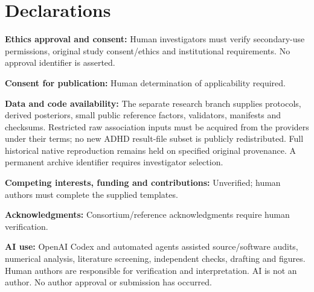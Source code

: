 \documentclass[11pt]{article}
\begin{document}
\section*{Declarations}
\textbf{Ethics approval and consent:} Human investigators must verify secondary-use permissions, original study consent/ethics and institutional requirements. No approval identifier is asserted.\par
\textbf{Consent for publication:} Human determination of applicability required.\par
\textbf{Data and code availability:} The separate research branch supplies protocols, derived posteriors, small public reference factors, validators, manifests and checksums. Restricted raw association inputs must be acquired from the providers under their terms; no new ADHD result-file subset is publicly redistributed. Full historical native reproduction remains held on specified original provenance. A permanent archive identifier requires investigator selection.\par
\textbf{Competing interests, funding and contributions:} Unverified; human authors must complete the supplied templates.\par
\textbf{Acknowledgments:} Consortium/reference acknowledgments require human verification.\par
\textbf{AI use:} OpenAI Codex and automated agents assisted source/software audits, numerical analysis, literature screening, independent checks, drafting and figures. Human authors are responsible for verification and interpretation. AI is not an author. No author approval or submission has occurred.
\end{document}
